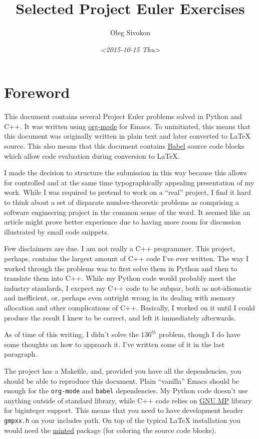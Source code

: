 \documentclass[11pt]{article}
\author{Oleg Sivokon}
\date{\textit{<2015-10-15 Thu>}}
\title{Selected Project Euler Exercises}
\begin{document}
\maketitle
\tableofcontents

\newpage

\section{Foreword}
\label{sec:orgheadline1}
This document contains several Project Euler problems solved in Python and
C++.  It was written using \href{http://orgmode.org/}{org-mode} for Emacs.  To uninitiated, this means
that this document was originally written in plain text and later converted to
\LaTeX{} source.  This also means that this document contains \href{http://orgmode.org/worg/org-contrib/babel/}{Babel} source code
blocks which allow code evaluation during conversion to \LaTeX{}.

I made the decision to structure the submission in this way because this
allows for controlled and at the same time typographically appealing
presentation of my work.  While I was required to pretend to work on a
``real'' project, I find it hard to think about a set of disparate
number-theoretic problems as comprising a software engineering project in the
common sense of the word.  It seemed like an article might prove better
experience due to having more room for discussion illustrated by small code
snippets.

Few disclaimers are due.  I am not really a C++ programmer.  This project,
perhaps, contains the largest amount of C++ code I've ever written.  The way I
worked through the problems was to first solve them in Python and then to
translate them into C++.  While my Python code would probably meet the
industry standards, I excpect my C++ code to be subpar, both as not-idiomatic
and inefficient, or, perhaps even outright wrong in its dealing with memory
allocation and other complications of C++.  Basically, I worked on it until I
could produce the result I knew to be correct, and left it immediately
afterwards.

As of time of this writing, I didn't solve the \(136^{th}\) problem, though I do
have some thoughts on how to approach it.  I've written some of it in the last
paragraph.

The project has a Makefile, and, provided you have all the dependencies, you
should be able to reproduce this document.  Plain ``vanilla'' Emacs should be
enough for the \texttt{org-mode} and \texttt{babel} dependencies.  My Python code doesn't
use anything outside of standard library, while C++ code relies on \href{https://gmplib.org/}{GNU MP}
library for biginteger support.  This means that you need to have development
header \texttt{gmpxx.h} on your includes path.  On top of the typical \LaTeX{}
installation you would need the \href{https://www.ctan.org/pkg/minted?lang=en}{minted} package (for coloring the source code
blocks).
\end{document}
